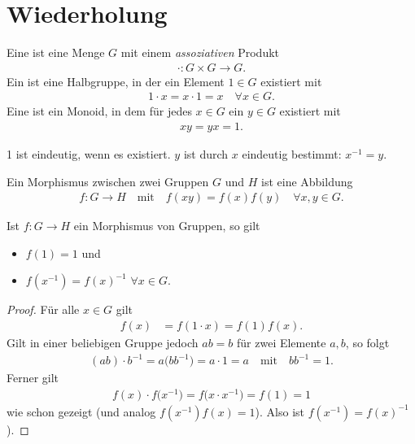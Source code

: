\section{Wiederholung}
\begin{definition}
	Eine  ist eine Menge $G$ mit einem \emph{assoziativen} Produkt
	\begin{align*}
		\cdot\colon G \times G \to G.
	\end{align*}
	Ein  ist eine Halbgruppe, in der ein Element $1 \in G$ existiert mit 
	\begin{align*}
		1\cdot x = x\cdot 1 = x \quad\forall x \in G.
	\end{align*}
	Eine  ist ein Monoid, in dem für jedes $x \in G$ ein $y \in G$ existiert mit
	\begin{align*}
		xy = yx = 1.
	\end{align*}
\end{definition}

\begin{remark}
		1 ist eindeutig, wenn es existiert. $y$ ist durch $x$ eindeutig bestimmt: $x^{-1} = y$.
\end{remark}

\begin{definition}[Morphismus]
	Ein Morphismus zwischen zwei Gruppen $G$ und $H$ ist eine Abbildung
	\begin{align*}
		f\colon G \to H \quad\text{mit}\quad f(xy) = f(x)f(y) \quad\forall x,y \in G.
	\end{align*}
\end{definition}

\begin{proposition}
	Ist $f\colon G \to H$ ein Morphismus von Gruppen, so gilt\begin{itemize}
		\item $f(1) = 1$ und
		\item $f(x^{-1}) = f(x)^{-1}$ $\forall x\in G$.
	\end{itemize}
\end{proposition}
\begin{proof}
	Für alle $x \in G$ gilt \begin{align*}
		f(x) &= f(1\cdot x) = f(1)f(x).
	\end{align*}
	Gilt in einer beliebigen Gruppe jedoch $ab=b$ für zwei Elemente $a,b$, so folgt
	\begin{align*}
		(ab)\cdot b^{-1} = a\big(bb^{-1}\big) = a\cdot 1 = a \quad\text{mit}\quad bb^{-1} = 1.
	\end{align*}
	Ferner gilt \begin{align*}
		f(x)\cdot f\big(x^{-1}\big) = f\big(x \cdot x^{-1}\big) = f(1) = 1
	\end{align*}
	wie schon gezeigt (und analog $f(x^{-1})f(x) = 1$). Also ist $f(x^{-1}) = f(x)^{-1}$).
\end{proof}

